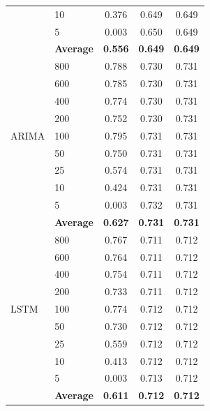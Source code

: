 \documentclass[11pt,a4paper]{article}
\begin{document}
\begin{table}[H]
\begin{tabular}{llccc}
 & 10  & 0.376 & 0.649 & 0.649 \\
 & 5   & 0.003 & 0.650 & 0.649 \\
 & \textbf{Average} & \textbf{0.556} & \textbf{0.649} & \textbf{0.649} \\
\midrule
\multirow{9}{*}{ARIMA}
 & 800 & 0.788 & 0.730 & 0.731 \\
 & 600 & 0.785 & 0.730 & 0.731 \\
 & 400 & 0.774 & 0.730 & 0.731 \\
 & 200 & 0.752 & 0.730 & 0.731 \\
 & 100 & 0.795 & 0.731 & 0.731 \\
 & 50  & 0.750 & 0.731 & 0.731 \\
 & 25  & 0.574 & 0.731 & 0.731 \\
 & 10  & 0.424 & 0.731 & 0.731 \\
 & 5   & 0.003 & 0.732 & 0.731 \\
 & \textbf{Average} & \textbf{0.627} & \textbf{0.731} & \textbf{0.731} \\
\midrule
\multirow{9}{*}{LSTM}
 & 800 & 0.767 & 0.711 & 0.712 \\
 & 600 & 0.764 & 0.711 & 0.712 \\
 & 400 & 0.754 & 0.711 & 0.712 \\
 & 200 & 0.733 & 0.711 & 0.712 \\
 & 100 & 0.774 & 0.712 & 0.712 \\
 & 50  & 0.730 & 0.712 & 0.712 \\
 & 25  & 0.559 & 0.712 & 0.712 \\
 & 10  & 0.413 & 0.712 & 0.712 \\
 & 5   & 0.003 & 0.713 & 0.712 \\
 & \textbf{Average} & \textbf{0.611} & \textbf{0.712} & \textbf{0.712} \\
\bottomrule
\end{tabular}
\end{table}
\end{document}
